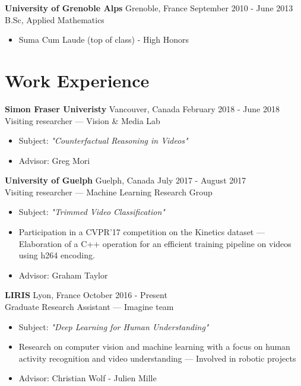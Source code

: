 \documentclass[10pt]{res} %
\begin{document}
\begin{resume}
\textbf{University of Grenoble Alps} \hfill Grenoble, France \hfill September 2010 - June 2013 \\
B.Sc, Applied Mathematics
\begin{itemize}
\item Suma Cum Laude (top of class) - High Honors
\end{itemize}
 

\section{\large Work Experience} 

\textbf{Simon Fraser Univeristy} \hfill Vancouver, Canada \hfill February 2018 - June 2018 \\
Visiting researcher --- Vision \& Media Lab
\begin{itemize}
\item Subject: \textit{"Counterfactual Reasoning in Videos" }
\item Advisor: Greg Mori
\end{itemize}

\textbf{University of Guelph} \hfill Guelph, Canada \hfill July 2017 - August 2017 \\
Visiting researcher --- Machine Learning Research Group
\begin{itemize}
\item Subject: \textit{"Trimmed Video Classification"}
\item Participation in a CVPR'17 competition on the Kinetics dataset --- Elaboration of a C++ operation for an efficient training  pipeline on videos using h264 encoding.
\item Advisor: Graham Taylor
\end{itemize}

 \newpage
 
\textbf{LIRIS} \hfill Lyon, France \hfill October 2016 - Present \\
Graduate Research Assistant --- Imagine team
\begin{itemize} 
\item Subject: \textit{"Deep Learning for Human Understanding"}
\item Research on computer vision and machine learning with a focus on human activity recognition and video understanding ---  Involved in robotic projects
\item Advisor: Christian Wolf - Julien Mille
\end{itemize}


\end{resume}
\end{document}
